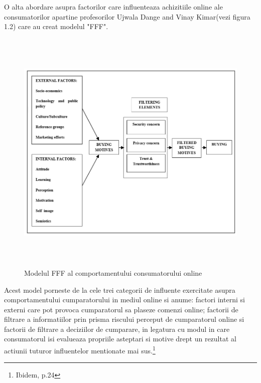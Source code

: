 \documentclass[a4paper, 12pt]{article}
\begin{document}
	\quad O alta abordare asupra factorilor care influenteaza achizitiile online ale consumatorilor apartine profesorilor Ujwala Dange and Vinay Kimar(vezi figura 1.2) care au creat modelul "FFF".  
	\begin{figure}[!htb]
		\centering
		\includegraphics[width=15cm, height=12cm]{"figures/SECOND.png"}
		\caption{Modelul FFF al comportamentului consumatorului online}\label{fig:second}
	\end{figure}

	Acest model porneste de la cele trei categorii de influente exercitate asupra comportamentului cumparatorului in mediul online si anume: factori interni si externi care pot provoca cumparatorul sa plaseze comenzi online; factorii de filtrare a informatiilor prin prisma riscului perceput de cumparatorul online si factorii de filtrare a deciziilor de cumparare, in legatura cu modul in care consumatorul isi evalueaza propriile asteptari si motive drept un rezultat al actiunii tuturor influentelor mentionate mai sus.\footnote{Ibidem, p.24}
	
\end{document}
